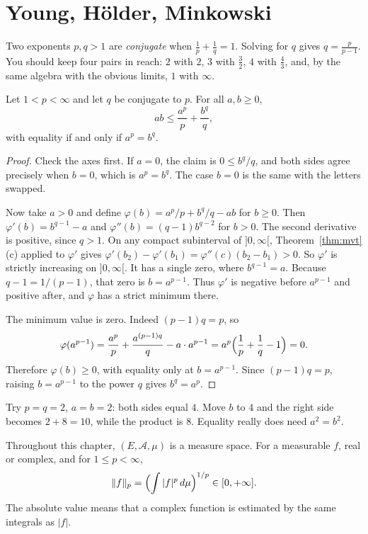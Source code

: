\section{Young, H\"older, Minkowski}

Two exponents $p,q>1$ are \emph{conjugate} when $\frac1p+\frac1q=1$. Solving for $q$ gives $q=\frac p{p-1}$. You should keep four pairs in reach: $2$ with $2$, $3$ with $\frac32$, $4$ with $\frac43$, and, by the same algebra with the obvious limits, $1$ with $\infty$.

\begin{lemma}\label{lem:young}
Let $1<p<\infty$ and let $q$ be conjugate to $p$. For all $a,b\ge0$,
\[ab\le\frac{a^p}p+\frac{b^q}q,\]
with equality if and only if $a^p=b^q$.
\end{lemma}
\begin{proof}
Check the axes first. If $a=0$, the claim is $0\le b^q/q$, and both sides agree precisely when $b=0$, which is $a^p=b^q$. The case $b=0$ is the same with the letters swapped.

Now take $a>0$ and define $\varphi(b)=a^p/p+b^q/q-ab$ for $b\ge0$. Then $\varphi'(b)=b^{q-1}-a$ and $\varphi''(b)=(q-1)b^{q-2}$ for $b>0$. The second derivative is positive, since $q>1$. On any compact subinterval of $]0,\infty[$, Theorem~\ref{thm:mvt}(c) applied to $\varphi'$ gives $\varphi'(b_2)-\varphi'(b_1)=\varphi''(c)(b_2-b_1)>0$. So $\varphi'$ is strictly increasing on $]0,\infty[$. It has a single zero, where $b^{q-1}=a$. Because $q-1=1/(p-1)$, that zero is $b=a^{p-1}$. Thus $\varphi'$ is negative before $a^{p-1}$ and positive after, and $\varphi$ has a strict minimum there.

The minimum value is zero. Indeed $(p-1)q=p$, so
\[\varphi(a^{p-1})=\frac{a^p}p+\frac{a^{(p-1)q}}q-a\cdot a^{p-1}=a^p\Bigl(\frac1p+\frac1q-1\Bigr)=0.\]
Therefore $\varphi(b)\ge0$, with equality only at $b=a^{p-1}$. Since $(p-1)q=p$, raising $b=a^{p-1}$ to the power $q$ gives $b^q=a^p$.
\end{proof}

Try $p=q=2$, $a=b=2$: both sides equal $4$. Move $b$ to $4$ and the right side becomes $2+8=10$, while the product is $8$. Equality really does need $a^2=b^2$.

Throughout this chapter, $(E,\mathcal A,\mu)$ is a measure space. For a measurable $f$, real or complex, and for $1\le p<\infty$,
\[\|f\|_p=\Bigl(\int|f|^p\,d\mu\Bigr)^{1/p}\in[0,+\infty].\]
The absolute value means that a complex function is estimated by the same integrals as $|f|$.

